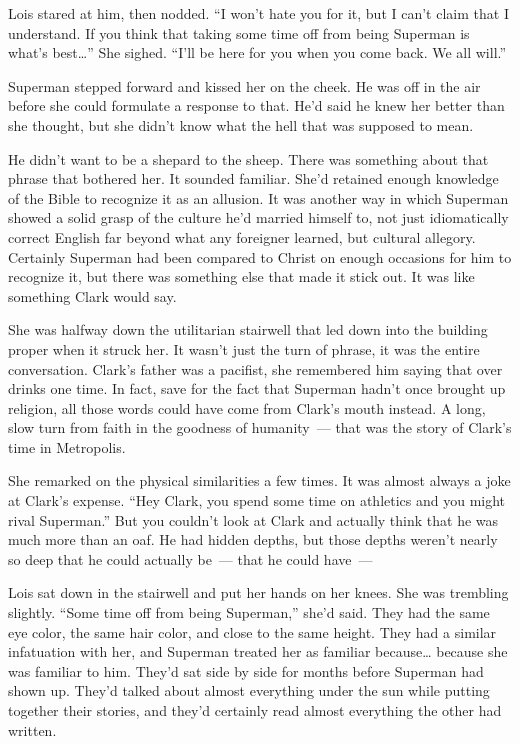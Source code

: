 \documentclass[ebook,12pt]{memoir}
\begin{document}
Lois stared at him, then nodded. ``I won't hate you for it, but I can't
claim that I understand. If you think that taking some time off from
being Superman is what's best\ldots{}'' She sighed. ``I'll be here for
you when you come back. We all will.''

Superman stepped forward and kissed her on the cheek. He was off in the
air before she could formulate a response to that. He'd said he knew her
better than she thought, but she didn't know what the hell that was
supposed to mean.

He didn't want to be a shepard to the sheep. There was something about
that phrase that bothered her. It sounded familiar. She'd retained
enough knowledge of the Bible to recognize it as an allusion. It was
another way in which Superman showed a solid grasp of the culture he'd
married himself to, not just idiomatically correct English far beyond
what any foreigner learned, but cultural allegory. Certainly Superman
had been compared to Christ on enough occasions for him to recognize it,
but there was something else that made it stick out. It was like
something Clark would say.

She was halfway down the utilitarian stairwell that led down into the
building proper when it struck her. It wasn't just the turn of phrase,
it was the entire conversation. Clark's father was a pacifist, she
remembered him saying that over drinks one time. In fact, save for the
fact that Superman hadn't once brought up religion, all those words
could have come from Clark's mouth instead. A long, slow turn from faith
in the goodness of humanity~--- that was the story of Clark's time in
Metropolis.

She remarked on the physical similarities a few times. It was almost
always a joke at Clark's expense. ``Hey Clark, you spend some time on
athletics and you might rival Superman.'' But you couldn't look at Clark
and actually think that he was much more than an oaf. He had hidden
depths, but those depths weren't nearly so deep that he could actually
be~--- that he could have~---

Lois sat down in the stairwell and put her hands on her knees. She was
trembling slightly. ``Some time off from being Superman,'' she'd said.
They had the same eye color, the same hair color, and close to the same
height. They had a similar infatuation with her, and Superman treated
her as familiar because\ldots{} because she was familiar to him. They'd
sat side by side for months before Superman had shown up. They'd talked
about almost everything under the sun while putting together their
stories, and they'd certainly read almost everything the other had
written.
\end{document}
